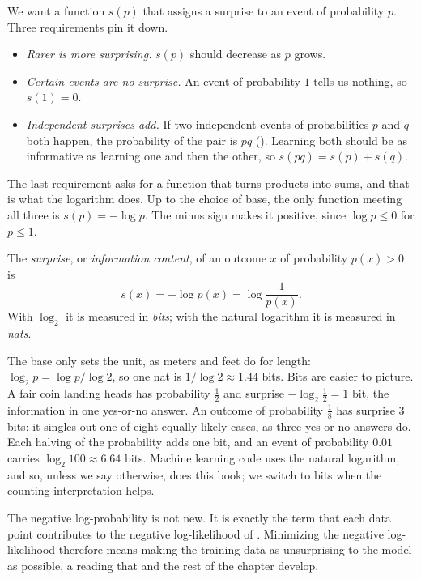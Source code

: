 We want a function $s(p)$ that assigns a surprise to an event of
probability $p$. Three requirements pin it down.
\begin{itemize}
  \item \emph{Rarer is more surprising.} $s(p)$ should decrease as $p$
    grows.
  \item \emph{Certain events are no surprise.} An event of probability
    $1$ tells us nothing, so $s(1) = 0$.
  \item \emph{Independent surprises add.} If two independent events of
    probabilities $p$ and $q$ both happen, the probability of the pair is
    $pq$ (). Learning both should be as
    informative as learning one and then the other, so $s(pq) = s(p) +
    s(q)$.
\end{itemize}
The last requirement asks for a function that turns products into sums,
and that is what the logarithm does. Up to the choice of base, the only
function meeting all three is $s(p) = -\log p$. The minus sign makes it
positive, since $\log p \le 0$ for $p \le 1$.

\begin{definition}[Surprise]
  \label{def:surprise}
  The \emph{surprise}, or \emph{information content}, of an outcome $x$
  of probability $p(x) > 0$ is
  \[
    s(x) = -\log p(x) = \log \frac{1}{p(x)} .
  \]
  With $\log_2$ it is measured in \emph{bits}; with the natural logarithm
  it is measured in \emph{nats}.
\end{definition}

The base only sets the unit, as meters and feet do for length:
$\log_2 p = \log p / \log 2$, so one nat is $1/\log 2 \approx 1.44$
bits. Bits are easier to picture. A fair coin landing heads has
probability $\tfrac12$ and surprise $-\log_2 \tfrac12 = 1$ bit, the
information in one yes-or-no answer. An outcome of probability
$\tfrac18$ has surprise $3$ bits: it singles out one of eight equally
likely cases, as three yes-or-no answers do. Each halving of the
probability adds one bit, and an event of probability $0.01$ carries
$\log_2 100 \approx 6.64$ bits. Machine learning code uses the natural
logarithm, and so, unless we say otherwise, does this book; we switch to
bits when the counting interpretation helps.

The negative log-probability is not new. It is exactly the term that
each data point contributes to the negative log-likelihood of
. Minimizing the negative log-likelihood
therefore means making the training data as unsurprising to the model as
possible, a reading that  and the rest of the
chapter develop.

